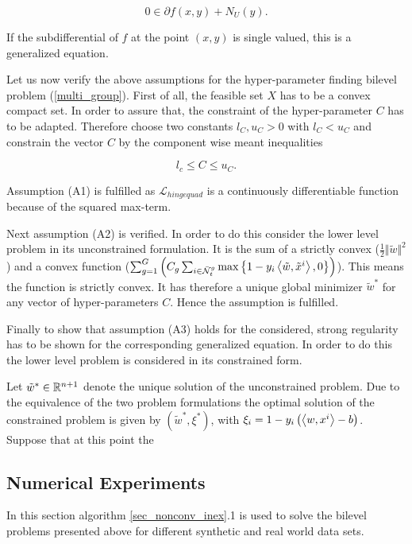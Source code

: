 \[ 0 \in \partial f(x,y) + N_U(y). \]

If the subdifferential of \(f\) at the point \((x,y)\) is single valued, this is a generalized equation.

Let us now verify the above assumptions for the hyper-parameter finding bilevel problem (\ref{multi_group}).
First of all, the feasible set \(X\) has to be a convex compact set. In order to assure that, the constraint of the hyper-parameter \(C\) has to be adapted.
Therefore choose two constants \(l_C, u_C > 0\) with \(l_C < u_C\) and constrain the vector \(C\) by the component wise meant inequalities

\[ l_c \leq C \leq u_C. \]

Assumption (A1) is fulfilled as \(\mathcal{L}_{hingequad}\) is a continuously differentiable function because of the squared max-term.

Next assumption (A2) is verified. In order to do this consider the lower level problem in its unconstrained formulation.
It is the sum of a strictly convex (\(\frac{1}{2}\Vert \tilde{w}\Vert^2\)) and a convex function (\(\sum_{g=1}^G \left(C_g\sum_{i\in \bar{\mathcal{N}}_t^g}\max\left\{1-y_i\left\langle \tilde{w},\tilde{x}^i\right\rangle,0\right\}\right)\)). This means the function is strictly convex. It has therefore a unique global minimizer \(\tilde{w}^*\) for any vector of hyper-parameters \(C\).
Hence the assumption is fulfilled.

Finally to show that assumption (A3) holds for the considered, strong regularity has to be shown for the corresponding generalized equation.
In order to do this the lower level problem is considered in its constrained form. 

Let \(\tilde{w}^*\in \mathbb{R}^{n+1}\) denote the unique solution of the unconstrained problem. Due to the equivalence of the two problem formulations the optimal solution of the constrained problem is given by \((\tilde{w}^*,\xi^*)\), with \(\xi_i = 1-y_i\left(\left\langle w,x^i\right\rangle-b\right)\).
Suppose that at this point the 










\subsection{Numerical Experiments}

In this section algorithm \ref{sec_nonconv_inex}.1 is used to solve the bilevel problems presented above for different synthetic and real world data sets.

